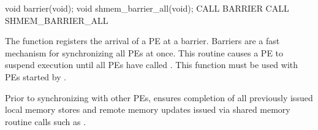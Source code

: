 \synC   %
void barrier(void);
void shmem_barrier_all(void);
\synF   %
CALL BARRIER
CALL SHMEM_BARRIER_ALL

{   
    The  function registers the arrival of a \ac{PE} at a
    barrier. Barriers are a fast mechanism for synchronizing all \ac{PE}s at
    once. This routine causes a \ac{PE} to suspend execution until all \ac{PE}s have
    called . This function must be used with \ac{PE}s started
    by .

    Prior to synchronizing with other \ac{PE}s,  ensures
    completion of all previously issued local memory stores and remote
    memory updates issued via shared memory routine calls such as
    .
}
{
}
\eAPI 
%
% 
% 
% 
% 
% 
% 
% 
% 
% 
% 
% 
% 
% 
% 
%        
